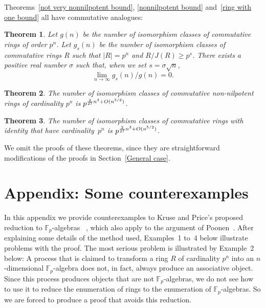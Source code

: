 \documentclass[12pt]{article}
\newtheorem{Thm}{Theorem}[section]
\newcommand{\Oh}{\mathnormal{O}}
\begin{document}
Theorems~\ref{not very nonnilpotent bound}, \ref{nonnilpotent bound} and~\ref{ring with one bound} all have commutative analogues: 

\begin{Thm} \label{commutative not very nonnilpotent bound}
Let $g(n)$ be the number of isomorphism classes of commutative rings of order $p^n$.
Let $g_s(n)$ be the number of isomorphism classes of commutative rings $R$ such that $|R|=p^n$ and $R/J(R)\geq p^s$. 
There exists a positive real number $\sigma$ such that, when we set $s=\sigma \sqrt{n}$,
\[
\lim_{n\rightarrow\infty} g_{s}(n)/g(n)=0.
\]
\end{Thm}

\begin{Thm} \label{commutative nonnilpotent bound}
The number of isomorphism classes of commutative non-nilpotent rings of cardinality $p^{n}$ is $p^{\frac{2}{27}n^{3} + \Oh(n^{5/2})}$.
\end{Thm}

\begin{Thm} \label{commutative ring with one bound}
The number of isomorphism classes of commutative rings with identity that have cardinality~$p^{n}$ is $p^{\frac{2}{27}n^{3} + \Oh(n^{5/2})}$.
\end{Thm}

We omit the proofs of these theorems, since they are straightforward modifications of the proofs in Section~\ref{General case}. 

\appendix

\section*{Appendix: Some counterexamples}

In this appendix we provide counterexamples to Kruse and Price's proposed reduction to $\mathbb{F}_p$-algebras~\cite[Theorem~3.1]{K & P} , which also apply to the argument of Poonen~\cite[Lemma~11.1]{Poonen}. After explaining some details of the method used, Examples~1 to~4 below illustrate problems with the proof. The most serious problem is illustrated by Example~2 below: A process that is claimed to transform a ring $R$ of cardinality $p^n$ into an $n$-dimensional $\mathbb{F}_p$-algebra does not, in fact,  always produce an associative object. Since this process produces objects that are not $\mathbb{F}_p$-algebras, we do not see how to use it to reduce the enumeration of rings to the enumeration of $\mathbb{F}_p$-algebras. So we are forced to produce a proof that avoids this reduction.
\end{document}
